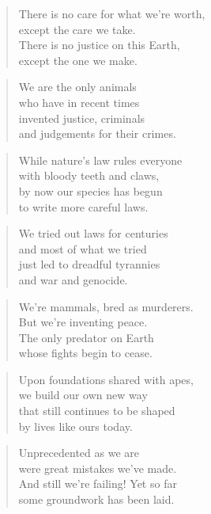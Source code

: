 \documentclass[10pt,a4paper]{article}
\begin{document}
\begin{multicols}{2}
\begin{verse}
There is no care for what we’re worth,\\
except the care we take.\\
There is no justice on this Earth,\\
except the one we make.
\end{verse}

\begin{verse}
We are the only animals\\
who have in recent times\\
invented justice, criminals\\
and judgements for their crimes.
\end{verse}

\begin{verse}
While nature’s law rules everyone\\
with bloody teeth and claws,\\
by now our species has begun\\
to write more careful laws.
\end{verse}

\begin{verse}
We tried out laws for centuries\\
and most of what we tried\\
just led to dreadful tyrannies\\
and war and genocide.
\end{verse}

\begin{verse}
We’re mammals, bred as murderers.\\
But we’re inventing peace.\\
The only predator on Earth\\
whose fights begin to cease.
\end{verse}

\begin{verse}
Upon foundations shared with apes,\\
we build our own new way\\
that still continues to be shaped\\
by lives like ours today.
\end{verse}

\begin{verse}
Unprecedented as we are\\
were great mistakes we’ve made.\\
And still we’re failing! Yet so far\\
some groundwork has been laid.
\end{verse}


\end{multicols}
\end{document}
